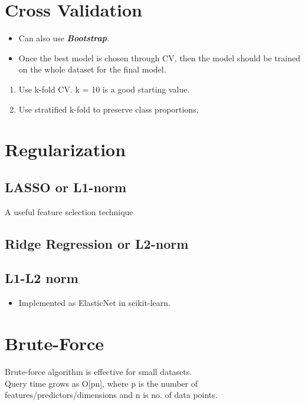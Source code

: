 \documentclass[a4paper, 12pt]{report}
\begin{document}
\section{Cross Validation}
\begin{itemize}
\item Can also use \textbf{\textit{Bootstrap}}.
\item Once the best model is chosen through CV, then the model should be trained on the whole dataset for the final model.
\end{itemize}
\begin{enumerate}
\item Use k-fold CV. k = 10 is a good starting value.
\item Use stratified k-fold to preserve class proportions.
\end{enumerate}


\section{Regularization}
\label{sec:regularization}
\subsection{LASSO or L1-norm}
A useful feature selection technique

\subsection{Ridge Regression or L2-norm}

\subsection{L1-L2 norm}
\begin{itemize}
\item Implemented as ElasticNet in {\color{red}scikit-learn}.
\end{itemize}
\section{Brute-Force}
\label{sec:bruteforce}

Brute-force algorithm is effective for small datasets.\\
Query time grows as O[pn], where p is the number of features/predictors/dimensions and n is no. of data points.
\end{document}
